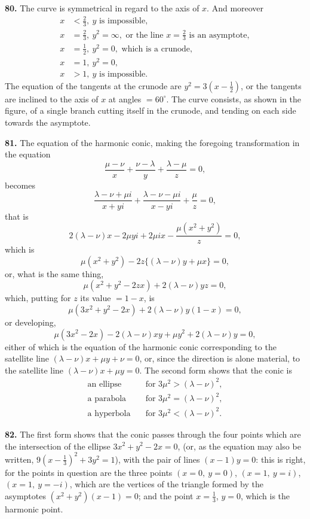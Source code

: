 \documentclass[11pt,a4paper]{article}
\theoremstyle{plain}
\begin{document}
\noindent\textbf{80.} The curve is symmetrical in regard to the axis of $x$. And moreover
\begin{align*}
x &< \tfrac{2}{3},\ y \text{ is impossible},\\
x &= \tfrac{2}{3},\ y^2 = \infty, \text{ or the line } x = \tfrac{2}{3} \text{ is an asymptote},\\
x &= \tfrac{1}{2},\ y^2 = 0, \text{ which is a crunode},\\
x &= 1,\ y^2 = 0,\\
x &> 1,\ y \text{ is impossible}.
\end{align*}
The equation of the tangents at the crunode are $y^2 = 3(x - \tfrac{1}{2})$, or the tangents are inclined to the axis of $x$ at angles $= 60^{\circ}$. The curve consists, as shown in the figure, of a single branch cutting itself in the crunode, and tending on each side towards the asymptote.

\noindent\textbf{81.} The equation of the harmonic conic, making the foregoing transformation in the equation
\[
\frac{\mu - \nu}{x} + \frac{\nu - \lambda}{y} + \frac{\lambda - \mu}{z} = 0,
\]
becomes
\[
\frac{\lambda - \nu + \mu i}{x+yi} + \frac{\lambda - \nu - \mu i}{x-yi} + \frac{\mu}{z} = 0,
\]
that is
\[
2(\lambda - \nu)x - 2\mu yi + 2\mu ix - \frac{\mu(x^2+y^2)}{z} = 0,
\]
which is
\[
\mu(x^2+y^2) - 2z\{(\lambda - \nu)y + \mu x\} = 0,
\]
or, what is the same thing,
\[
\mu(x^2+y^2-2zx) + 2(\lambda-\nu)yz = 0,
\]
which, putting for $z$ its value $= 1-x$, is
\[
\mu(3x^2+y^2-2x) + 2(\lambda-\nu)y(1-x) = 0,
\]
or developing,
\[
\mu(3x^2 - 2x) - 2(\lambda-\nu)xy + \mu y^2 + 2(\lambda-\nu)y = 0,
\]
either of which is the equation of the harmonic conic corresponding to the satellite line $(\lambda - \nu)x + \mu y + \nu = 0$, or, since the direction is alone material, to the satellite line $(\lambda - \nu)x + \mu y = 0$. The second form shows that the conic is
\begin{align*}
\text{an ellipse} &\quad \text{for } 3\mu^2 > (\lambda-\nu)^2,\\
\text{a parabola} &\quad \text{for } 3\mu^2 = (\lambda-\nu)^2,\\
\text{a hyperbola} &\quad \text{for } 3\mu^2 < (\lambda-\nu)^2.
\end{align*}

\noindent\textbf{82.} The first form shows that the conic passes through the four points which are the intersection of the ellipse $3x^2 + y^2 - 2x = 0$, (or, as the equation may also be written, $9(x - \tfrac{1}{3})^2 + 3y^2 = 1$), with the pair of lines $(x-1)y = 0$: this is right, for the points in question are the three points $(x=0,\ y=0)$, $(x=1,\ y=i)$, $(x=1,\ y=-i)$, which are the vertices of the triangle formed by the asymptotes $(x^2+y^2)(x-1) = 0$; and the point $x = \tfrac{1}{3}$, $y = 0$, which is the harmonic point.
\end{document}
